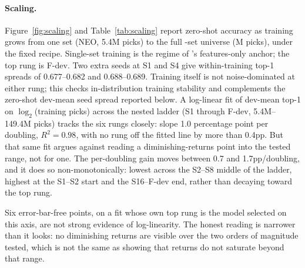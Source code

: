 \paragraph{Scaling.}
Figure~\ref{fig:scaling} and Table~\ref{tab:scaling} report zero-shot
accuracy as training grows from one set (NEO, 5.4M picks) to the full
\FdevSets-set universe (\FdevPicks M picks), under the fixed recipe.
Single-set training is the regime of \citet{bertram2024cards}'s
features-only anchor; the top rung is F-dev.
Two extra seeds at S1 and S4 give within-training top-1 spreads of
0.677--0.682 and 0.688--0.689. Training itself is not noise-dominated at
either rung; this checks in-distribution training stability and
complements the zero-shot dev-mean seed spread reported below.
A log-linear fit of dev-mean top-1 on $\log_2$(training picks) across the
nested ladder (S1 through F-dev, 5.4M--149.4M picks) tracks the six rungs
closely: slope 1.0 percentage point per doubling, $R^2=0.98$, with no rung
off the fitted line by more than 0.4pp. But that same fit argues against
reading a diminishing-returns point into the tested range, not for one.
The per-doubling gain moves between 0.7 and 1.7pp/doubling, and it does so
non-monotonically: lowest across the S2--S8 middle of the ladder, highest
at the S1--S2 start and the S16--F-dev end, rather than decaying toward
the top rung.

Six error-bar-free points, on a fit whose own top rung is the model
selected on this axis, are not strong evidence of log-linearity. The
honest reading is narrower than it looks: no diminishing returns are
visible over the two orders of magnitude tested, which is not the same as
showing that returns do not saturate beyond that range.

